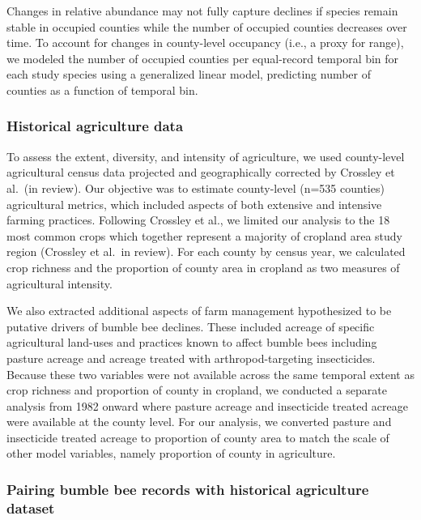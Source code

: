 \documentclass[11pt,]{article}
\begin{document}
Changes in relative abundance may not fully capture declines if species
remain stable in occupied counties while the number of occupied counties
decreases over time. To account for changes in county-level occupancy
(i.e., a proxy for range), we modeled the number of occupied counties
per equal-record temporal bin for each study species using a generalized
linear model, predicting number of counties as a function of temporal
bin.

\hypertarget{historical-agriculture-data}{%
\subsubsection{Historical agriculture
data}\label{historical-agriculture-data}}

To assess the extent, diversity, and intensity of agriculture, we used
county-level agricultural census data projected and geographically
corrected by Crossley et al.~(in review). Our objective was to estimate
county-level (n=535 counties) agricultural metrics, which included
aspects of both extensive and intensive farming practices. Following
Crossley et al., we limited our analysis to the 18 most common crops
which together represent a majority of cropland area study region
(Crossley et al.~in review). For each county by census year, we
calculated crop richness and the proportion of county area in cropland
as two measures of agricultural intensity.

We also extracted additional aspects of farm management hypothesized to
be putative drivers of bumble bee declines. These included acreage of
specific agricultural land-uses and practices known to affect bumble
bees including pasture acreage and acreage treated with
arthropod-targeting insecticides. Because these two variables were not
available across the same temporal extent as crop richness and
proportion of county in cropland, we conducted a separate analysis from
1982 onward where pasture acreage and insecticide treated acreage were
available at the county level. For our analysis, we converted pasture
and insecticide treated acreage to proportion of county area to match
the scale of other model variables, namely proportion of county in
agriculture.

\hypertarget{pairing-bumble-bee-records-with-historical-agriculture-dataset}{%
\subsubsection{Pairing bumble bee records with historical agriculture
dataset}\label{pairing-bumble-bee-records-with-historical-agriculture-dataset}}
\end{document}
